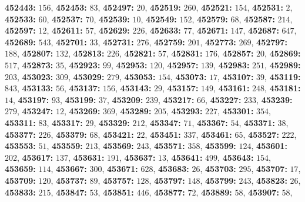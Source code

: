 \textsf{\bfseries 452443:} $156$, \textsf{\bfseries 452453:} $83$, \textsf{\bfseries 452497:} $20$, \textsf{\bfseries 452519:} $260$, \textsf{\bfseries 452521:} $154$, \textsf{\bfseries 452531:} $2$, \textsf{\bfseries 452533:} $60$, \textsf{\bfseries 452537:} $70$, \textsf{\bfseries 452539:} $10$, \textsf{\bfseries 452549:} $152$, \textsf{\bfseries 452579:} $68$, \textsf{\bfseries 452587:} $214$, \textsf{\bfseries 452597:} $12$, \textsf{\bfseries 452611:} $57$, \textsf{\bfseries 452629:} $226$, \textsf{\bfseries 452633:} $77$, \textsf{\bfseries 452671:} $147$, \textsf{\bfseries 452687:} $647$, \textsf{\bfseries 452689:} $543$, \textsf{\bfseries 452701:} $33$, \textsf{\bfseries 452731:} $276$, \textsf{\bfseries 452759:} $201$, \textsf{\bfseries 452773:} $269$, \textsf{\bfseries 452797:} $188$, \textsf{\bfseries 452807:} $132$, \textsf{\bfseries 452813:} $226$, \textsf{\bfseries 452821:} $57$, \textsf{\bfseries 452831:} $176$, \textsf{\bfseries 452857:} $20$, \textsf{\bfseries 452869:} $517$, \textsf{\bfseries 452873:} $35$, \textsf{\bfseries 452923:} $99$, \textsf{\bfseries 452953:} $120$, \textsf{\bfseries 452957:} $139$, \textsf{\bfseries 452983:} $251$, \textsf{\bfseries 452989:} $203$, \textsf{\bfseries 453023:} $309$, \textsf{\bfseries 453029:} $279$, \textsf{\bfseries 453053:} $154$, \textsf{\bfseries 453073:} $17$, \textsf{\bfseries 453107:} $39$, \textsf{\bfseries 453119:} $843$, \textsf{\bfseries 453133:} $56$, \textsf{\bfseries 453137:} $156$, \textsf{\bfseries 453143:} $29$, \textsf{\bfseries 453157:} $149$, \textsf{\bfseries 453161:} $248$, \textsf{\bfseries 453181:} $14$, \textsf{\bfseries 453197:} $93$, \textsf{\bfseries 453199:} $37$, \textsf{\bfseries 453209:} $239$, \textsf{\bfseries 453217:} $66$, \textsf{\bfseries 453227:} $233$, \textsf{\bfseries 453239:} $279$, \textsf{\bfseries 453247:} $12$, \textsf{\bfseries 453269:} $369$, \textsf{\bfseries 453289:} $205$, \textsf{\bfseries 453293:} $227$, \textsf{\bfseries 453301:} $354$, \textsf{\bfseries 453311:} $83$, \textsf{\bfseries 453317:} $29$, \textsf{\bfseries 453329:} $212$, \textsf{\bfseries 453347:} $71$, \textsf{\bfseries 453367:} $54$, \textsf{\bfseries 453371:} $38$, \textsf{\bfseries 453377:} $226$, \textsf{\bfseries 453379:} $68$, \textsf{\bfseries 453421:} $22$, \textsf{\bfseries 453451:} $337$, \textsf{\bfseries 453461:} $65$, \textsf{\bfseries 453527:} $222$, \textsf{\bfseries 453553:} $51$, \textsf{\bfseries 453559:} $213$, \textsf{\bfseries 453569:} $243$, \textsf{\bfseries 453571:} $358$, \textsf{\bfseries 453599:} $124$, \textsf{\bfseries 453601:} $202$, \textsf{\bfseries 453617:} $137$, \textsf{\bfseries 453631:} $191$, \textsf{\bfseries 453637:} $13$, \textsf{\bfseries 453641:} $499$, \textsf{\bfseries 453643:} $154$, \textsf{\bfseries 453659:} $114$, \textsf{\bfseries 453667:} $300$, \textsf{\bfseries 453671:} $628$, \textsf{\bfseries 453683:} $26$, \textsf{\bfseries 453703:} $295$, \textsf{\bfseries 453707:} $17$, \textsf{\bfseries 453709:} $120$, \textsf{\bfseries 453737:} $89$, \textsf{\bfseries 453757:} $128$, \textsf{\bfseries 453797:} $148$, \textsf{\bfseries 453799:} $243$, \textsf{\bfseries 453823:} $26$, \textsf{\bfseries 453833:} $215$, \textsf{\bfseries 453847:} $53$, \textsf{\bfseries 453851:} $446$, \textsf{\bfseries 453877:} $72$, \textsf{\bfseries 453889:} $58$, \textsf{\bfseries 453907:} $58$, 
